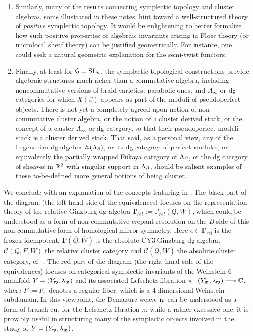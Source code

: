 \begin{enumerate}
    \item Similarly, many of the results connecting symplectic topology and cluster algebras, some illustrated in these notes, hint toward a well-structured theory of {\it positive} symplectic topology. It would be enlightening to better formalize how such positive properties of algebraic invariants arising in Floer theory (or microlocal sheaf theory) can be justified geometrically. For instance, one could seek a natural geometric explanation for the semi-twist functors.\\

    \item Finally, at least for $\mathsf{G}=\operatorname{SL}_n$, the symplectic topological constructions provide algebraic structures much richer than a commutative algebra, including noncommutative versions of braid varieties, parabolic ones, and $A_\infty$ or dg categories for which $X(\beta)$ appears as part of the moduli of pseudoperfect objects. There is not yet a completely agreed upon notion of non-commutative cluster algebra, or the notion of a cluster derived stack, or the concept of a cluster $A_\infty$ or dg category, so that their pseudoperfect moduli stack is a cluster derived stack. That said, as a personal view, any of the Legendrian dg algebra $\mathbb{A}(\Lambda_\beta)$, or its dg category of perfect modules, or equivalently the partially wrapped Fukaya category of $\Lambda_\beta$, or the dg category of sheaves in $\mathbb{R}^2$ with singular support in $\Lambda_\beta$, should be salient examples of these to-be-defined more general notions of being cluster.\\
\end{enumerate}
\normalsize

We conclude with an explanation of the concepts featuring in . The black part of the diagram (the left hand side of the equivalences) focuses on the representation theory of the relative Ginzburg dg-algebra $\bm\Gamma_{rel}:=\bm\Gamma_{rel}(Q,W)$, which could be understood as a form of non-commutative crepant resolution on the $B$-side of this non-commutative form of homological mirror symmetry. Here $e\in \bm\Gamma_{rel}$ is the frozen idempotent, $\bm\Gamma(\overline{Q},\overline{W})$ is the absolute CY3 Ginzburg dg-algebra, $\mathcal{C}(Q,F,W)$ the relative cluster category and $\mathcal{C}(\overline{Q},\overline{W})$ the absolute cluster category, cf.~\cite{amiot2011generalizedclustercategories,MR4581969,KellerWu2023Higgs}. The red part of the diagram (the right hand side of the equivalences) focuses on categorical symplectic invariants of the Weinstein 6-manifold $Y=(Y_{\mathfrak{w}},\lambda_{\mathfrak{w}})$ and its associated Lefschetz fibration $\pi:(Y_{\mathfrak{w}},\lambda_{\mathfrak{w}})\longrightarrow\mathbb{C}$, where $F:=F_\pi$ denotes a regular fiber, which is a 4-dimensional Weinstein subdomain. In this viewpoint, the Demazure weave $\mathfrak{w}$ can be understood as a form of branch cut for the Lefschetz fibration $\pi$: while a rather excessive one, it is provably useful in structuring many of the symplectic objects involved in the study of $Y=(Y_{\mathfrak{w}},\lambda_{\mathfrak{w}})$.\\

